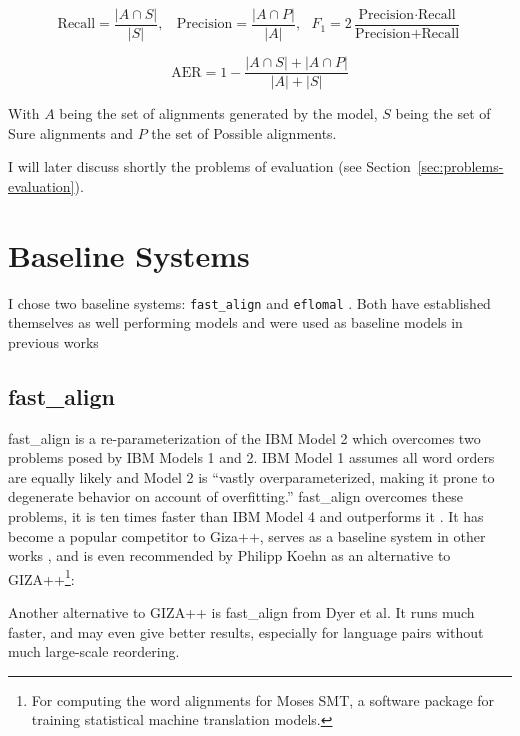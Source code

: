 \[
	\text{Recall} = \frac{|A\cap S|}{|S|},~~~~\text{Precision}  = \frac{|A\cap P|}{|A|},~~~F_1 = 2\frac{\text{Precision}\cdot\text{Recall}}{\text{Precision}+\text{Recall}}
\]

\[
	\text{AER} = 1- \frac{|A\cap S|+|A\cap P|}{|A|+|S|}
\]

With $A$ being the set of alignments generated by the model, $S$ being the set of Sure alignments and $P$ the set of Possible alignments.

I will later discuss shortly the problems of evaluation (see Section~\ref{sec:problems-evaluation}).


\section{Baseline Systems}
I chose two baseline systems: \texttt{fast\_align} \autocite{dyer-etal-2013-simple} and \texttt{eflomal} \autocite{Ostling2016efmaral}. 
Both have established themselves as well performing models and were used as baseline models in previous works \autocites{Ostling2016efmaral,jalili-sabet-etal-2020-simalign,steingrimsson-etal-2021-combalign}

\subsection{fast\_align}
fast\_align is a re-parameterization of the IBM Model 2 which overcomes two problems posed by IBM Models 1 and 2. 
IBM Model 1 assumes all word orders are equally likely and Model 2 is \enquote{vastly overparameterized, making it prone to degenerate behavior on account of overfitting.} \autocite{dyer-etal-2013-simple} 
fast\_align overcomes these problems, it is ten times faster than IBM Model 4 and outperforms it \autocite{dyer-etal-2013-simple}.
It has become a popular competitor to Giza++, serves as a baseline system in other works \autocites{Ostling2016efmaral,jalili-sabet-etal-2020-simalign}, and is even recommended by Philipp Koehn as an alternative to GIZA++\footnote{For computing the word alignments for Moses SMT, a software package for training statistical machine translation models.}:



\begin{displayquote}
Another alternative to GIZA++ is fast\_align from Dyer et al. It runs much faster, and may even give better results, especially for language pairs without much large-scale reordering. \autocite[115]{koehn-moses-smt-2022}
\end{displayquote}
 

